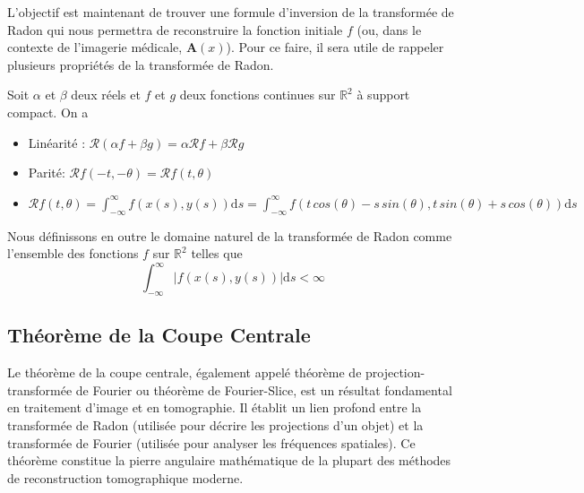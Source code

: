 L'objectif est maintenant de trouver une formule d'inversion de la transformée de Radon qui nous permettra de reconstruire la fonction initiale $f$ (ou, dans le contexte de l'imagerie médicale, 
$\mathbf{A}(x)$). Pour ce faire, il sera utile de rappeler plusieurs propriétés de la transformée de Radon.
\begin{proposition}
    Soit $\alpha$ et $\beta$ deux réels et $f$ et $g$ deux fonctions continues sur $\mathbb{R}^2$ à support compact. On a
    \begin{itemize}
        \item[(i)] Linéarité : $\mathcal{R}(\alpha f + \beta g) = \alpha \mathcal{R}f + \beta \mathcal{R}g$
        \item[(ii)] Parité: $\mathcal{R}f(-t,-\theta) = \mathcal{R}f(t,\theta)$
        \item[(iii)] $\mathcal{R}f(t, \theta) = \int_{-\infty}^{\infty} f(x(s), y(s))\mathrm{d}s = \int_{-\infty}^{\infty} f(t\,cos(\theta)-s\,sin(\theta), t\,sin(\theta)+s\,cos(\theta))\mathrm{d}s$
    \end{itemize}
\end{proposition}
Nous définissons en outre le domaine naturel de la transformée de Radon comme l'ensemble des fonctions $f$ sur $\mathbb{R}^2$ telles que 
\begin{equation}
\int_{-\infty}^{\infty} |f(x(s), y(s))|\mathrm{d}s < \infty
\end{equation}
\subsection{Théorème de la Coupe Centrale}
Le théorème de la coupe centrale, également appelé théorème de projection-transformée de Fourier ou théorème de Fourier-Slice, est un résultat fondamental en traitement d'image et en tomographie. Il établit un lien profond entre la transformée de Radon (utilisée pour décrire les projections d'un objet) et la transformée de Fourier (utilisée pour analyser les fréquences spatiales). Ce théorème constitue la pierre angulaire mathématique de la plupart des méthodes de reconstruction tomographique moderne.


